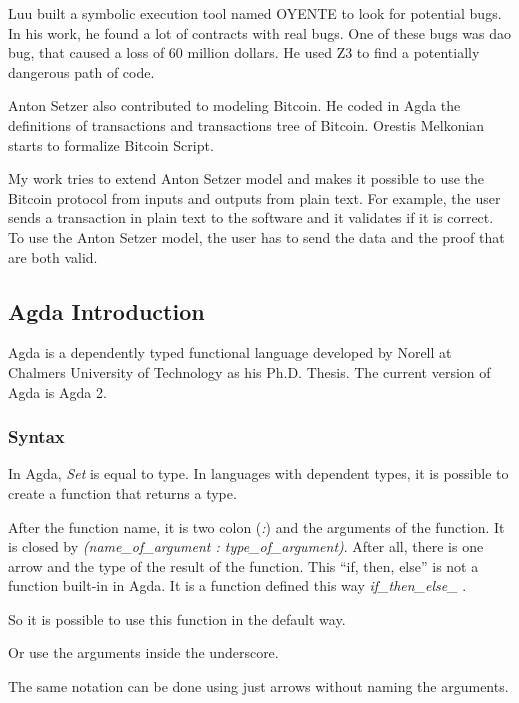 Luu \cite{luu2016making} built a symbolic execution tool named OYENTE to look for potential bugs.
In his work, he found a lot of contracts with real bugs.
One of these bugs was \gls{dao} bug, that caused a loss of 60 million dollars.
He used Z3 to find a potentially dangerous path of code.

Anton Setzer \cite{setzer2018modelling} also contributed to modeling Bitcoin.
He coded in Agda the definitions of transactions and
transactions tree of Bitcoin.
Orestis Melkonian starts to formalize Bitcoin Script.

My work tries to extend Anton Setzer model and makes it possible to use the Bitcoin protocol
from inputs and outputs from plain text.
For example, the user sends a transaction in plain text to the software and it validates if it is correct.
To use the Anton Setzer model, the user has to send the data and the proof that are both valid.

\subsection{Agda Introduction}
Agda is a dependently typed functional language developed by Norell at Chalmers University of Technology
as his Ph.D. Thesis.
The current version of Agda is Agda 2.

  \subsubsection{Syntax}
  In Agda, \emph{Set} is equal to type.
  In languages with dependent types, it is possible to create a function that returns a type.


  After the function name, it is two colon (\emph{:}) and the arguments of the function.
  It is closed by \emph{(name\_of\_argument : type\_of\_argument)}.
  After all, there is one arrow and the type of the result of the function.
  This ``if, then, else'' is not a function built-in in Agda.
  It is a function defined this way \emph{if\_then\_else\_} .

  So it is possible to use this function in the default way.


  Or use the arguments inside the underscore.


  The same notation can be done using just arrows without naming the arguments.

